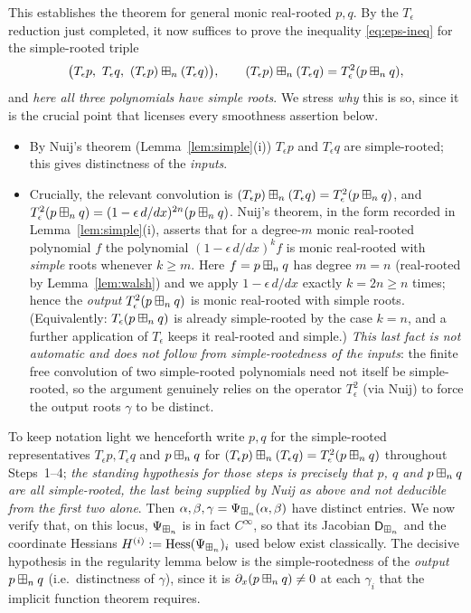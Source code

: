 This establishes the theorem for general monic real-rooted $p,q$. By the
$T_\epsilon$ reduction just completed, it now suffices to prove the inequality
\eqref{eq:eps-ineq} for the simple-rooted triple
\[
\bigl(T_\epsilon p,\ T_\epsilon q,\ (T_\epsilon p)\qfourbn(T_\epsilon q)\bigr),
\qquad
(T_\epsilon p)\qfourbn(T_\epsilon q)=T_\epsilon^2(p\qfourbn q),
\]
and \emph{here all three polynomials have simple roots}. We stress \emph{why} this
is so, since it is the crucial point that licenses every smoothness assertion
below.

\begin{itemize}\setlength\itemsep{2pt}
\item By Nuij's theorem (Lemma~\ref{lem:simple}(i)) $T_\epsilon p$ and $T_\epsilon q$
are simple-rooted; this gives distinctness of the \emph{inputs}.
\item Crucially, the relevant convolution is
$(T_\epsilon p)\boxplus_n(T_\epsilon q)=T_\epsilon^2(p\boxplus_n q)$, and
$T_\epsilon^2(p\boxplus_n q)=(1-\epsilon\,d/dx)^{2n}(p\boxplus_n q)$. Nuij's theorem,
in the form recorded in Lemma~\ref{lem:simple}(i), asserts that for a degree-$m$
monic real-rooted polynomial $f$ the polynomial $(1-\epsilon\,d/dx)^{k}f$ is monic
real-rooted with \emph{simple} roots whenever $k\ge m$. Here $f=p\boxplus_n q$ has
degree $m=n$ (real-rooted by Lemma~\ref{lem:walsh}) and we apply $1-\epsilon\,d/dx$
exactly $k=2n\ge n$ times; hence the \emph{output} $T_\epsilon^2(p\boxplus_n q)$ is
monic real-rooted with simple roots. (Equivalently:
$T_\epsilon(p\boxplus_n q)$ is already simple-rooted by the case $k=n$, and a further
application of $T_\epsilon$ keeps it real-rooted and simple.) \emph{This last
fact is not automatic and does not follow from simple-rootedness of the inputs}:
the finite free convolution of two simple-rooted polynomials need not itself be
simple-rooted, so the argument genuinely relies on the operator $T_\epsilon^2$
(via Nuij) to force the output roots $\gamma$ to be distinct.
\end{itemize}

\noindent
To keep notation light we henceforth write $p,q$ for the simple-rooted
representatives $T_\epsilon p,T_\epsilon q$ and $p\boxplus_n q$ for
$(T_\epsilon p)\boxplus_n(T_\epsilon q)=T_\epsilon^2(p\boxplus_n q)$ throughout
Steps~1--4; \emph{the standing hypothesis for those steps is precisely that $p$,
$q$ and $p\boxplus_n q$ are all simple-rooted, the last being supplied by Nuij as
above and not deducible from the first two alone}. Then
$\alpha,\beta,\gamma=\Psi_{\boxplus_n}(\alpha,\beta)$ have distinct entries. We now
verify that, on this locus, $\Psi_{\boxplus_n}$ is in fact $C^\infty$, so
that its Jacobian $\mathsf{D}_{\boxplus_n}$ and the coordinate Hessians
$H^{(i)}:=\operatorname{Hess}(\Psi_{\boxplus_n})_i$ used below exist classically. The decisive
hypothesis in the regularity lemma below is the simple-rootedness of the
\emph{output} $p\boxplus_n q$ (i.e.\ distinctness of $\gamma$), since it is
$\partial_x(p\boxplus_n q)\neq0$ at each $\gamma_i$ that the implicit function
theorem requires.

